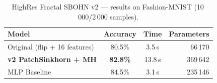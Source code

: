 \begin{table}[h]
\centering
\caption{HighRes Fractal SBOHN v2 --- results on Fashion-MNIST (10\,000/2\,000 samples).}
\begin{tabular}{lccr}
\hline
\textbf{Model} & \textbf{Accuracy} & \textbf{Time} & \textbf{Parameters} \\
\hline
Original (flip + 16 features)           & 80.5\%          & 3.5\,s  & 66\,170 \\
\textbf{v2 PatchSinkhorn + MH}      & \textbf{82.8\%} & 13.8\,s & 369\,642 \\
MLP Baseline                        & 84.5\%          & 3.1\,s  & 235\,146 \\
\hline
\end{tabular}
\end{table}
